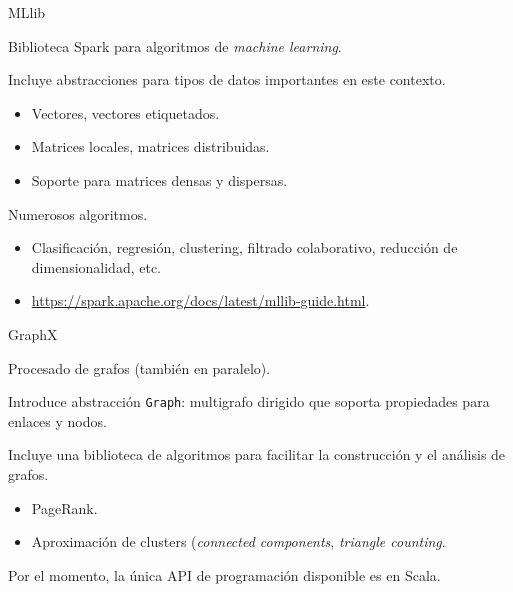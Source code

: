 
\begin{frame}{MLlib}
\begin{wideitemize}
 \item Biblioteca Spark para algoritmos de \textit{machine learning}.
 \item Incluye abstracciones para tipos de datos importantes en este contexto.
 \begin{itemize}
  \item Vectores, vectores etiquetados.
  \item Matrices locales, matrices distribuidas.
  \item Soporte para matrices densas y dispersas.
 \end{itemize}
 
 \item Numerosos algoritmos.
 \begin{itemize}
  \item Clasificación, regresión, clustering, filtrado colaborativo, reducción
  de dimensionalidad, etc.
  \item \url{https://spark.apache.org/docs/latest/mllib-guide.html}.
 \end{itemize}

\end{wideitemize}


\end{frame}


\begin{frame}{GraphX}
\begin{wideitemize}
 \item Procesado de grafos (también en paralelo).
 \item Introduce abstracción \texttt{Graph}: multigrafo dirigido que soporta
 propiedades para enlaces y nodos.
 \item Incluye una biblioteca de algoritmos para facilitar la construcción y el 
 análisis de grafos.
 \begin{itemize}
  \item PageRank.
  \item Aproximación de clusters (\textit{connected components}, \textit{triangle
  counting}.
 \end{itemize}
 
 \item Por el momento, la única API de programación disponible es en Scala.

\end{wideitemize}


\end{frame}

